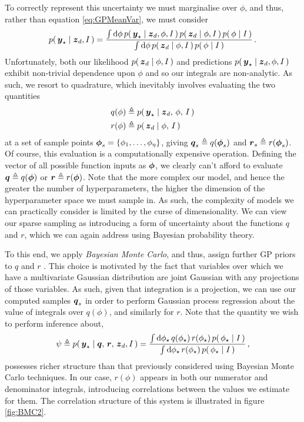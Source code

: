 \documentclass{acmtrans2m}
\begin{document}
To correctly represent this uncertainty we must marginalise over $\phi$, and thus, rather than equation \eqref{eq:GPMeanVar}, we must consider
\begin{equation} \label{eq:Marginalising}
 p\!\left(\,\boldsymbol{y}_\star\mid\boldsymbol{z}_d,I\,\right)=\frac{\int\mathrm{d}\phi\, p\!\left(\,\boldsymbol{y}_\star\mid\boldsymbol{z}_d,\phi,I\,\right)p\!\left(\,\boldsymbol{z}_d\mid\phi,I\,\right)p\!\left(\,\phi\mid I\,\right)}
{\int\mathrm{d}\phi\, p\!\left(\,\boldsymbol{z}_d\mid\phi,I\,\right)p\!\left(\,\phi\mid I\,\right)}\,.
\end{equation}
Unfortunately, both our likelihood $p\!\left(\,\boldsymbol{z}_d\mid\phi,I\,\right)$ and predictions $p\!\left(\,\boldsymbol{y}_\star\mid\boldsymbol{z}_d,\phi,I\,\right)$ exhibit non-trivial dependence upon $\phi$ and so our integrals are non-analytic. As such, we resort to quadrature, which inevitably involves evaluating the two quantities
\begin{equation}
\begin{split}
q(\phi)& \triangleq p\!\left(\,\boldsymbol{y}_\star\mid\boldsymbol{z}_d,\,\phi,\,I\,\right) \\
r(\phi)& \triangleq p\!\left(\,\boldsymbol{z}_d\mid\phi,\,I\,\right)
\end{split}
\end{equation}
at a set of sample points $\boldsymbol{\phi}_s=\{\phi_1,\ldots,\phi_\eta\}$, giving $\boldsymbol{q}_s\triangleq q(\boldsymbol{\phi}_s)$ and $\boldsymbol{r}_s\triangleq r(\boldsymbol{\phi}_s)$. Of course, this evaluation is a computationally expensive operation. Defining the vector of all possible function inputs as $\boldsymbol{\phi}$, we clearly can't afford to evaluate $\boldsymbol{q}\triangleq q(\boldsymbol{\phi})$ or $\boldsymbol{r}\triangleq r(\boldsymbol{\phi})$. Note that the more complex our model, and hence the greater the number of hyperparameters, the higher the dimension of the hyperparameter space we must sample in. As such, the complexity of models we can practically consider is limited by the curse of dimensionality. We can view our sparse sampling as introducing a form of uncertainty about the functions $q$ and $r$, which we can again address using Bayesian probability theory. 

To this end, we apply \emph{Bayesian Monte Carlo}, and thus, assign further GP priors to $q$ and $r$ \cite{BZMonteCarlo}. This choice is motivated by the fact that variables over which we have a multivariate Gaussian distribution are joint Gaussian with any projections of those variables. As such, given that integration is a projection, we can use our computed samples $\boldsymbol{q}_s$ in order to perform Gaussian process regression about the value of integrals over $q(\phi)$, and similarly for $r$. Note that the quantity we wish to perform inference about, 
\begin{equation}
 \psi\triangleq p\!\left(\,\boldsymbol{y}_\star\mid\boldsymbol{q},\,\boldsymbol{r},\,\boldsymbol{z}_d,I\,\right)= \frac{\int\mathrm{d}\phi_\star\, q(\phi_\star)\,r(\phi_\star)\,p\!\left(\,\phi_\star\mid I\,\right)}
{\int\mathrm{d}\phi_\star\,r(\phi_\star)\,p\!\left(\,\phi_\star\mid I\,\right)}\,,
\end{equation} 
possesses richer structure than that previously considered using Bayesian Monte Carlo techniques. In our case, $r(\phi)$ appears in both our numerator and denominator integrals, introducing correlations between the values we estimate for them. The correlation structure of this system is illustrated in figure \ref{fig:BMC2}. 
\end{document}
